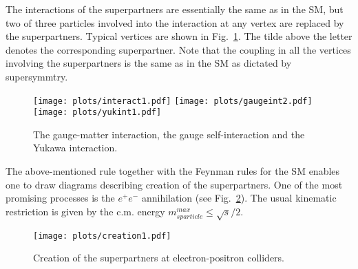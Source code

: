 \documentclass{cernyrep}
\begin{document}
The
interactions of the superpartners are essentially the same as
in the SM, but two of three particles involved into the
interaction at any vertex are replaced by the superpartners.
Typical vertices are shown in Fig.~\ref{yukint}. The tilde
above the letter denotes the corresponding superpartner. Note
that the coupling  in all the vertices involving
the superpartners is the same as in the SM as dictated by supersymmtry. 

\begin{figure}[htb]\vspace{-0.5cm}
\begin{center}
\leavevmode
\texttt{[image: plots/interact1.pdf]}
\hspace*{10mm}
\texttt{[image: plots/gaugeint2.pdf]}\\
\vspace*{5mm}
\texttt{[image: plots/yukint1.pdf]}
\end{center}
\caption{The gauge-matter interaction, the gauge
self-interaction and the Yukawa interaction.}
\label{yukint}
\end{figure}

The above-mentioned rule together with the Feynman rules for the
SM enables one to draw diagrams describing creation of the
superpartners. One of the most promising processes is the $e^+e^-$
annihilation (see Fig.~\ref{creation}). The usual kinematic restriction is given by the c.m. energy
$m^{max}_{sparticle} \leq \sqrt{s}/2$.  \begin{figure}[htb]\vspace*{-2mm}
\begin{center}
\leavevmode
\texttt{[image: plots/creation1.pdf]}
\end{center}
\vspace*{-3mm}
\caption{Creation of the superpartners at electron-positron colliders.}
\label{creation}
\end{figure}
\end{document}

